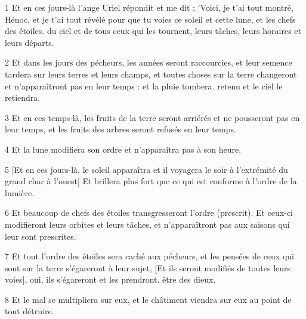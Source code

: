 \par 1 Et en ces jours-là l'ange Uriel répondit et me dit : 'Voici, je t'ai tout montré, Hénoc, et je t'ai tout révélé pour que tu voies ce soleil et cette lune, et les chefs des étoiles. du ciel et de tous ceux qui les tournent, leurs tâches, leurs horaires et leurs départs.
\par 2 Et dans les jours des pécheurs, les années seront raccourcies, et leur semence tardera sur leurs terres et leurs champs, et toutes choses sur la terre changeront et n'apparaîtront pas en leur temps : et la pluie tombera. retenu et le ciel le retiendra.
\par 3 Et en ces temps-là, les fruits de la terre seront arriérés et ne pousseront pas en leur temps, et les fruits des arbres seront refusés en leur temps.
\par 4 Et la lune modifiera son ordre et n'apparaîtra pas à son heure.
\par 5 [Et en ces jours-là, le soleil apparaîtra et il voyagera le soir à l'extrémité du grand char à l'ouest] Et brillera plus fort que ce qui est conforme à l'ordre de la lumière.
\par 6 Et beaucoup de chefs des étoiles transgresseront l'ordre (prescrit). Et ceux-ci modifieront leurs orbites et leurs tâches, et n'apparaîtront pas aux saisons qui leur sont prescrites.
\par 7 Et tout l'ordre des étoiles sera caché aux pécheurs, et les pensées de ceux qui sont sur la terre s'égareront à leur sujet, [Et ils seront modifiés de toutes leurs voies], oui, ils s'égareront et les prendront. être des dieux.
\par 8 Et le mal se multipliera sur eux, et le châtiment viendra sur eux au point de tout détruire.


